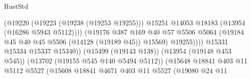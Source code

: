 \begin{lexlean}{RustStd}
\begin{coremodule}
                                                        (@19220
                                                          (@19223 (@19238 (@19253 @19255)))
                                                          @15251
                                                          @14053
                                                          @18183
                                                          (@13954 (@16286 @5943 @5112))))
                                                      (@19176
                                                        @387
                                                        @169
                                                        @40
                                                        @57
                                                        @5506
                                                        @5064
                                                        (@19184
                                                          @45
                                                          @40
                                                          @45
                                                          @5506
                                                          (@14128 (@19189 @45))
                                                          @15569)
                                                        @19255))))
                                                @15331
                                                @15334
                                                @15337
                                                @15340))
                                            (@15499 (@19143 @138))
                                            (@13954 (@19148 @453 @545))
                                            (@13702 (@19155 @545 @140 @5494 @5112))
                                            (@15648
                                              @18841
                                              @403
                                              @11
                                              @5112
                                              @5527
                                              (@15608
                                                @18841
                                                @4671
                                                @403
                                                @11
                                                @5527
                                                (@19080
                                                  @24
                                                  @11

\end{coremodule}
\end{lexlean}

